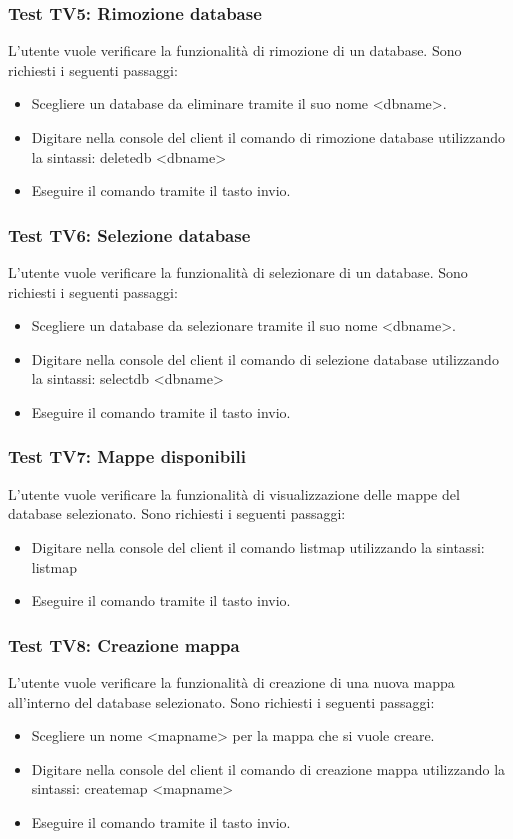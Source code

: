 \documentclass[a4paper]{article}
\begin{document}
		\subsubsection{Test TV5: Rimozione database}
		L'utente vuole verificare la funzionalità di rimozione di un database.
		Sono richiesti i seguenti passaggi:
		\begin{itemize}
			\item Scegliere un database da eliminare tramite il suo nome <dbname>.
			\item Digitare nella console del client il comando di rimozione database utilizzando la sintassi: deletedb <dbname>
			\item Eseguire il comando tramite il tasto invio.
		\end{itemize}
		
		\subsubsection{Test TV6: Selezione database}
		L'utente vuole verificare la funzionalità di selezionare di un database.
		Sono richiesti i seguenti passaggi:
		\begin{itemize}
			\item Scegliere un database da selezionare tramite il suo nome <dbname>.
			\item Digitare nella console del client il comando di selezione database utilizzando la sintassi: selectdb <dbname>
			\item Eseguire il comando tramite il tasto invio.
		\end{itemize}
		
		\subsubsection{Test TV7: Mappe disponibili}
		L'utente vuole verificare la funzionalità di visualizzazione delle mappe del database selezionato.
		Sono richiesti i seguenti passaggi:
		\begin{itemize}
			\item Digitare nella console del client il comando listmap utilizzando la sintassi: listmap
			\item Eseguire il comando tramite il tasto invio.
		\end{itemize}
		
		\subsubsection{Test TV8: Creazione mappa}
		L'utente vuole verificare la funzionalità di creazione di una nuova mappa all'interno del database selezionato.
		Sono richiesti i seguenti passaggi:
		\begin{itemize}
			\item Scegliere un nome <mapname> per la mappa che si vuole creare.
			\item Digitare nella console del client il comando di creazione mappa utilizzando la sintassi: createmap <mapname>
			\item Eseguire il comando tramite il tasto invio.
		\end{itemize}
		
\end{document}
